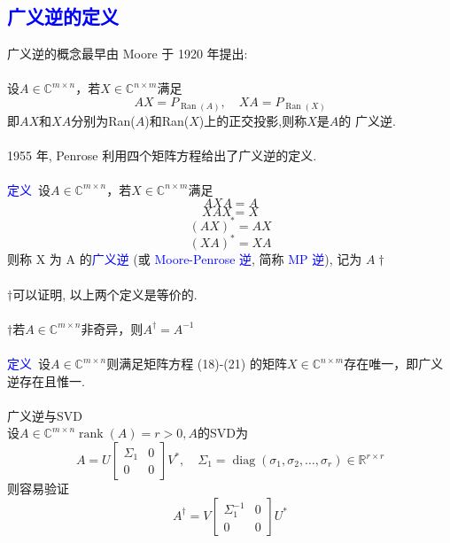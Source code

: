 \documentclass[12pt,a4paper]{article}
\begin{document}
\subsection{\textcolor{blue}{广义逆的定义}}
\noindent 广义逆的概念最早由 Moore 于 1920 年提出:\\
\\
设$A \in \mathbb{C}^{m \times n}$，若$X \in \mathbb{C}^{n \times m}$满足
\begin{equation}
A X=P_{\operatorname{Ran}(A)}, \quad X A=P_{\operatorname{Ran}(X)}
\end{equation}
即$AX$和$XA$分别为Ran($A$)和Ran($X$)上的正交投影,则称$X$是$A$的
广义逆.\\
\\
1955 年, Penrose 利用四个矩阵方程给出了广义逆的定义.\\
\\
\textcolor{blue}{定义}~设$A \in \mathbb{C}^{m \times n}$，若$X \in \mathbb{C}^{n \times m}$满足
\begin{equation}
AXA=A 
\end{equation} 
\begin{equation}
XAX=X
\end{equation}
\begin{equation}
(AX)^*=AX
\end{equation}
\begin{equation}
(X A)^{*}=X A 
\end{equation}
则称 X 为 A 的\textcolor{blue}{广义逆} (或 \textcolor{blue}{Moore-Penrose 逆}, 简称 \textcolor{blue}{MP 逆}), 记为 $A\dagger$\\
\\
$\dagger$可以证明, 以上两个定义是等价的.\\
\\
$\dagger$若$A \in \mathbb{C}^{m \times n}$非奇异，则$A^{\dagger}=A^{-1}$\\
\\
\textcolor{blue}{定义}~设$A \in \mathbb{C}^{m \times n}$则满足矩阵方程 (18)-(21) 的矩阵$X \in \mathbb{C}^{n \times m}$存在唯一，即广义逆存在且惟一.\\
\\
广义逆与SVD\\
设$A \in \mathbb{C}^{m \times n}\operatorname{rank}(A)=r>0, A$的SVD为
$$
A=U\left[\begin{array}{cc}{\Sigma_{1}} & {0} \\ {0} & {0}\end{array}\right] V^{*}, \quad \Sigma_{1}=\operatorname{diag}\left(\sigma_{1}, \sigma_{2}, \ldots, \sigma_{r}\right) \in \mathbb{R}^{r \times r}
$$
则容易验证
$$
A^{\dagger}=V\left[\begin{array}{cc}{\Sigma_{1}^{-1}} & {0} \\ {0} & {0}\end{array}\right] U^{*}
$$
\end{document}
